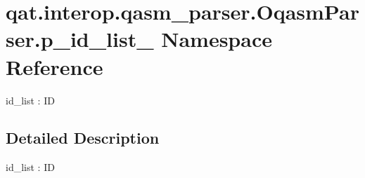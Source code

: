 \hypertarget{namespaceqat_1_1interop_1_1qasm__parser_1_1OqasmParser_1_1p__id__list__0}{\section{qat.\-interop.\-qasm\-\_\-parser.\-Oqasm\-Parser.\-p\-\_\-id\-\_\-list\-\_ Namespace Reference}
\label{namespaceqat_1_1interop_1_1qasm__parser_1_1OqasmParser_1_1p__id__list__0}
}


id\-\_\-list \-: I\-D  




\subsection{Detailed Description}
id\-\_\-list \-: I\-D 